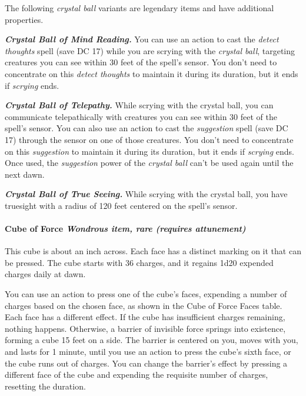 \documentclass[
]{article}
\begin{document}
The following \emph{crystal ball} variants are legendary items and have
additional properties.

\emph{\textbf{Crystal Ball of Mind Reading.}} You can use an action to
cast the \emph{detect thoughts} spell (save DC 17) while you are scrying
with the \emph{crystal ball}, targeting creatures you can see within 30
feet of the spell's sensor. You don't need to concentrate on this
\emph{detect thoughts} to maintain it during its duration, but it ends
if \emph{scrying} ends.

\emph{\textbf{Crystal Ball of Telepathy.}} While scrying with the
crystal ball, you can communicate telepathically with creatures you can
see within 30 feet of the spell's sensor. You can also use an action to
cast the \emph{suggestion} spell (save DC 17) through the sensor on one
of those creatures. You don't need to concentrate on this
\emph{suggestion} to maintain it during its duration, but it ends if
\emph{scrying} ends. Once used, the \emph{suggestion} power of the
\emph{crystal ball} can't be used again until the next dawn.

\emph{\textbf{Crystal Ball of True Seeing.}} While scrying with the
crystal ball, you have truesight with a radius of 120 feet centered on
the spell's sensor.

\hypertarget{cube-of-force-wondrous-item-rare-requires-attunement}{%
\paragraph{\texorpdfstring{Cube of Force \emph{Wondrous item, rare
(requires
attunement)}}{Cube of Force Wondrous item, rare (requires attunement)}}\label{cube-of-force-wondrous-item-rare-requires-attunement}}

This cube is about an inch across. Each face has a distinct marking on
it that can be pressed. The cube starts with 36 charges, and it regains
1d20 expended charges daily at dawn.

You can use an action to press one of the cube's faces, expending a
number of charges based on the chosen face, as shown in the Cube of
Force Faces table. Each face has a different effect. If the cube has
insufficient charges remaining, nothing happens. Otherwise, a barrier of
invisible force springs into existence, forming a cube 15 feet on a
side. The barrier is centered on you, moves with you, and lasts for 1
minute, until you use an action to press the cube's sixth face, or the
cube runs out of charges. You can change the barrier's effect by
pressing a different face of the cube and expending the requisite number
of charges, resetting the duration.
\end{document}
